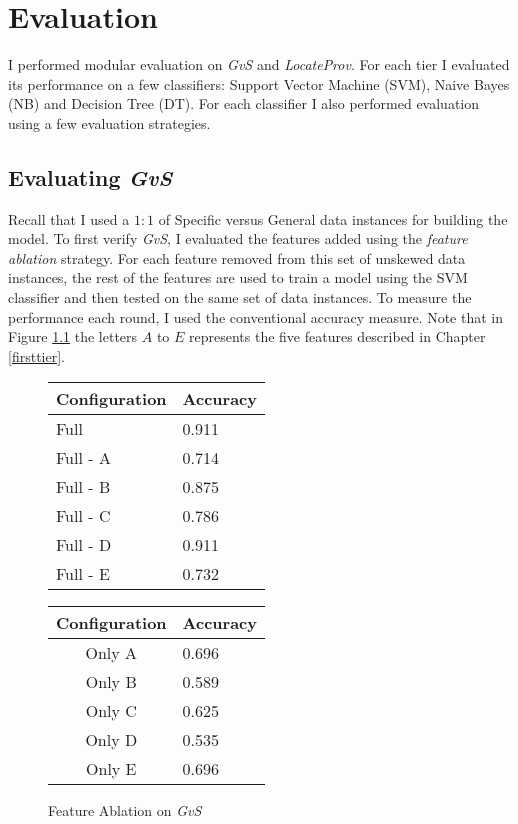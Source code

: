 \chapter{Evaluation}
\label{evaluation}
I performed modular evaluation on {\it GvS} and {\it LocateProv}. For each tier I evaluated its performance on a few classifiers: Support Vector Machine (SVM), Naive Bayes (NB) and Decision Tree (DT). For each classifier I also performed evaluation using a few evaluation strategies.

\section{Evaluating {\it GvS}}
Recall that I used a $1:1$ of Specific versus General data instances for building the model. To first verify {\it GvS}, I evaluated the features added using the {\it feature ablation} strategy. For each feature removed from this set of unskewed data instances, the rest of the features are used to train a model using the SVM classifier and then tested on the same set of data instances. To measure the performance each round, I used the conventional accuracy measure. Note that in Figure \ref{fig:ablation_first} the letters $A$ to $E$ represents the five features described in Chapter \ref{firsttier}.

\begin{figure}[ht]
\begin{minipage}[b]{0.45\linewidth}\centering
\begin{tabular}{ l | l }
Configuration & Accuracy \\
\hline
Full		& 0.911 \\
Full - A	& 0.714 \\
Full - B	& 0.875 \\
Full - C	& 0.786 \\
Full - D	& 0.911 \\
Full - E	& 0.732 \\
\end{tabular}
\end{minipage}
\hspace{0.5cm}
\begin{minipage}[b]{0.45\linewidth}\centering
\begin{tabular}{ c | l }
Configuration & Accuracy \\
\hline
Only A	& 0.696 \\
Only B	& 0.589 \\
Only C	& 0.625 \\
Only D	& 0.535 \\
Only E	& 0.696 \\
\end{tabular}
\end{minipage}
\caption{Feature Ablation on {\it GvS}}
\label{fig:ablation_first}
\end{figure}

